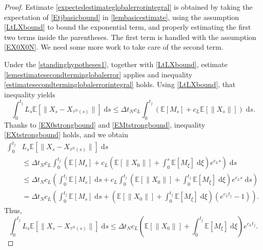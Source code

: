 \documentclass[reqno,12pt]{amsart}
\theoremstyle{plain} %
\theoremstyle{definition} %
\begin{document}
\begin{proof}
    Estimate \eqref{expectedestimateglobalerrorintegral} is obtained by taking the expectation of \eqref{Etjbasicbound} in \cref{lembasicestimate}, using the assumption \eqref{LtLXbound} to bound the exponential term, and properly estimating the first two terms inside the parentheses. The first term is handled with the assumption \eqref{EX0X0N}. We need some more work to take care of the second term.
    
    Under the \cref{standinghypotheses1}, together with \eqref{LtLXbound}, estimate \cref{lemestimatesecondterminglobalerror} applies and inequality \eqref{estimatesecondterminglobalerrorintegral} holds.
    Using \eqref{LtLXbound}, that inequality yields
    \[
        \int_0^{t_j} L_s \mathbb{E}[\|X_s - X_{\tau^N(s)}\|] \;\mathrm{d}s \leq \Delta t_N c_L \int_0^{t_j} (\mathbb{E}[M_s] + c_L\mathbb{E}[\|X_s\|]) \;\mathrm{d}s.
    \]
    Thanks to \eqref{EX0strongbound} and \eqref{EMtstrongbound}, inequality \eqref{EXtstrongbound} holds, and we obtain
    \begin{align*}
        \int_0^{t_j} & L_s \mathbb{E}[\|X_s - X_{\tau^N(s)}\|] \;\mathrm{d}s \\
        & \leq \Delta t_N c_L \int_0^{t_j} \left(\mathbb{E}[M_s] + c_L\left(\mathbb{E}[\|X_0\|] + \int_0^s \mathbb{E}[M_\xi]\;\mathrm{d}\xi\right)e^{c_L s} \right)\;\mathrm{d}s \\
        & \leq \Delta t_N c_L \left(\int_0^{t_j} \mathbb{E}[M_s] \;\mathrm{d}s + c_L \int_0^{t_j}\left(\mathbb{E}[\|X_0\|] + \int_0^{t_j} \mathbb{E}[M_\xi]\;\mathrm{d}\xi\right)e^{c_L s} \;\mathrm{d}s\right) \\
        & = \Delta t_N c_L \left(\int_0^{t_j} \mathbb{E}[M_s] \;\mathrm{d}s + \left(\mathbb{E}[\|X_0\|] + \int_0^{t_j} \mathbb{E}[M_\xi]\;\mathrm{d}\xi\right)\left(e^{c_L t_j} - 1\right) \right).
    \end{align*}
    Thus,
    \begin{equation}
        \label{expectedestimatesecondterminglobalerrorintegral}
        \int_0^{t_j} L_s \mathbb{E}[\|X_s - X_{\tau^N(s)}\|] \;\mathrm{d}s \leq \Delta t_N c_L \left(\mathbb{E}[\|X_0\|] + \int_0^{t_j} \mathbb{E}[M_\xi]\;\mathrm{d}\xi\right)e^{c_L t_j}.
    \end{equation}


\end{proof}
\end{document}
